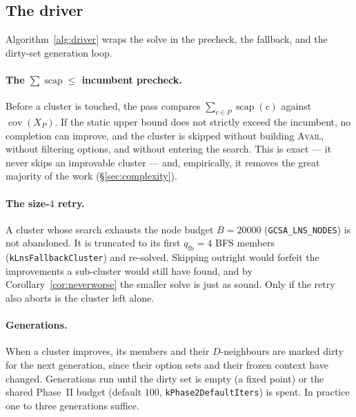 \documentclass[11pt,a4paper]{article}
\theoremstyle{definition}
\theoremstyle{plain}
\theoremstyle{remark}
\newcommand{\cov}{\operatorname{cov}}
\newcommand{\scap}{\operatorname{scap}}
\begin{document}
\subsection{The driver}

Algorithm~\ref{alg:driver} wraps the solve in the precheck, the fallback,
and the dirty-set generation loop.

\paragraph{The $\sum \scap \le$ incumbent precheck.}
Before a cluster is touched, the pass compares
$\sum_{c \in P} \scap(c)$ against $\cov(X_P)$. If the static upper bound
does not strictly exceed the incumbent, no completion can improve, and
the cluster is skipped without building \textsc{Avail}, without filtering
options, and without entering the search. This is exact --- it never skips
an improvable cluster --- and, empirically, it removes the great majority
of the work (\S\ref{sec:complexity}).

\paragraph{The size-$4$ retry.}
A cluster whose search exhausts the node budget $B = 20000$
(\texttt{GCSA\_LNS\_NODES}) is not abandoned. It is truncated to its
first $q_{\mathrm{fb}} = 4$ BFS members (\texttt{kLnsFallbackCluster}) and
re-solved. Skipping outright would forfeit the improvements a
sub-cluster would still have found, and by Corollary~\ref{cor:neverworse}
the smaller solve is just as sound. Only if the retry also aborts is the
cluster left alone.

\paragraph{Generations.}
When a cluster improves, its members and their $D$-neighbours are marked
dirty for the next generation, since their option sets and their frozen
context have changed. Generations run until the dirty set is empty (a
fixed point) or the shared Phase~II budget (default $100$,
\texttt{kPhase2DefaultIters}) is spent. In practice one to three
generations suffice.
\end{document}
